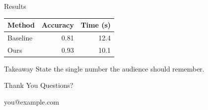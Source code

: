 \documentclass[aspectratio=169]{beamer}
\begin{document}
\begin{frame}{Results}
  \begin{table}
    \centering
    \begin{tabular}{lrr}
      \toprule
      Method   & Accuracy & Time (s) \\
      \midrule
      Baseline & 0.81     & 12.4     \\
      Ours     & 0.93     & 10.1     \\
      \bottomrule
    \end{tabular}
  \end{table}
  \vspace{1em}
  \begin{block}{Takeaway}
    State the single number the audience should remember.
  \end{block}
\end{frame}

\begin{frame}{Thank You}
  \centering
  \Large Questions?
  \vspace{1em}

  \normalsize you@example.com
\end{frame}
\end{document}
